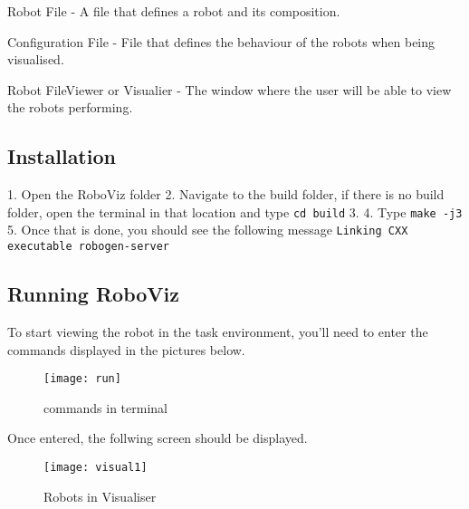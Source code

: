 Robot File - A file that defines a robot and its composition.

Configuration File - File that defines the behaviour of the robots when being visualised.

Robot FileViewer or Visualier - The window where the user will be able to view the robots performing.



\subsection{Installation}
\label{s:installation}

1. Open the RoboViz folder
2. Navigate to the build folder, if there is no build folder, open the terminal in that location and type \texttt{cd build}
3. %
4. Type \texttt{make -j3}
5. Once that is done, you should see the following message \texttt{Linking CXX executable robogen-server}


 


\subsection{Running RoboViz}
\label{s:runningroboviz}

To start viewing the robot in the task environment, you'll need to enter the commands displayed in the pictures below.

\begin{figure}[htpb]
    \centering
    \texttt{[image: run]}
    \caption{commands in terminal }
    \label{fig:commands-in-terminal}
\end{figure}

Once entered, the follwing screen should be displayed.

\begin{figure}[htpb]
    \centering
    \texttt{[image: visual1]}
    \caption{Robots in Visualiser}
    \label{fig:robots-in-visualiser}
\end{figure}

